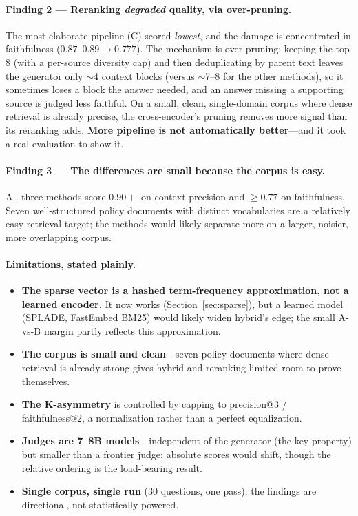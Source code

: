 \documentclass[11pt,a4paper,oneside]{report}
\begin{document}
\paragraph{Finding 2 --- Reranking \emph{degraded} quality, via over-pruning.} The most elaborate
pipeline (C) scored \emph{lowest}, and the damage is concentrated in faithfulness ($0.87$--$0.89 \to
0.777$). The mechanism is over-pruning: keeping the top 8 (with a per-source diversity cap) and then
deduplicating by parent text leaves the generator only $\sim$4 context blocks (versus $\sim$7--8 for the
other methods), so it sometimes loses a block the answer needed, and an answer missing a supporting
source is judged less faithful. On a small, clean, single-domain corpus where dense retrieval is already
precise, the cross-encoder's pruning removes more signal than its reranking adds. \textbf{More pipeline
is not automatically better}---and it took a real evaluation to show it.

\paragraph{Finding 3 --- The differences are small because the corpus is easy.} All three methods score
$0.90+$ on context precision and $\geq 0.77$ on faithfulness. Seven well-structured policy documents with
distinct vocabularies are a relatively easy retrieval target; the methods would likely separate more on
a larger, noisier, more overlapping corpus.

\paragraph{Limitations, stated plainly.}
\begin{itemize}
  \item \textbf{The sparse vector is a hashed term-frequency approximation, not a learned encoder.} It
  now works (Section~\ref{sec:sparse}), but a learned model (SPLADE, FastEmbed BM25) would likely widen
  hybrid's edge; the small A-vs-B margin partly reflects this approximation.
  \item \textbf{The corpus is small and clean}---seven policy documents where dense retrieval is already
  strong gives hybrid and reranking limited room to prove themselves.
  \item \textbf{The K-asymmetry} is controlled by capping to precision@3 / faithfulness@2, a
  normalization rather than a perfect equalization.
  \item \textbf{Judges are 7--8B models}---independent of the generator (the key property) but smaller
  than a frontier judge; absolute scores would shift, though the relative ordering is the load-bearing
  result.
  \item \textbf{Single corpus, single run} (30 questions, one pass): the findings are directional, not
  statistically powered.
\end{itemize}
\end{document}
